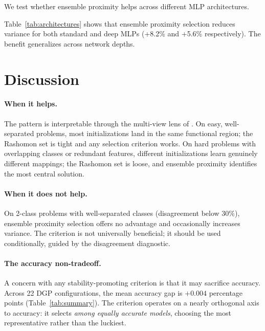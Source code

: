 \documentclass[11pt]{article}
\begin{document}
We test whether ensemble proximity helps across different MLP architectures.

\begin{table}[ht]
  \centering
  \caption{Architecture comparison.
    Ensemble proximity helps both shallow and deep MLPs.}
  \label{tab:architectures}
  
\end{table}

Table~\ref{tab:architectures} shows that ensemble proximity selection reduces variance for both standard and deep MLPs (+8.2\% and +5.6\% respectively).
The benefit generalizes across network depths.


\section{Discussion}
\label{sec:discussion}

\paragraph{When it helps.}
The pattern is interpretable through the multi-view lens of \citet{allenzhu2023ensemble}.
On easy, well-separated problems, most initializations land in the same functional region; the Rashomon set is tight and any selection criterion works.
On hard problems with overlapping classes or redundant features, different initializations learn genuinely different mappings; the Rashomon set is loose, and ensemble proximity identifies the most central solution.

\paragraph{When it does not help.}
On 2-class problems with well-separated classes (disagreement below 30\%), ensemble proximity selection offers no advantage and occasionally increases variance.
The criterion is not universally beneficial; it should be used conditionally, guided by the disagreement diagnostic.

\paragraph{The accuracy non-tradeoff.}
A concern with any stability-promoting criterion is that it may sacrifice accuracy.
Across 22 DGP configurations, the mean accuracy gap is $+0.004$ percentage points (Table~\ref{tab:summary}).
The criterion operates on a nearly orthogonal axis to accuracy: it selects \emph{among equally accurate models}, choosing the most representative rather than the luckiest.
\end{document}
